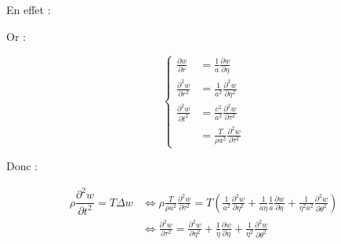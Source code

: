 \documentclass[a4,12pt]{article}
\begin{document}
En effet :


Or :

$$
\left\{\begin{aligned}
    \frac{\partial w}{\partial r} &= \frac{1}{a} \frac{\partial w}{\partial \eta} \\
    \frac{\partial^2 w}{\partial r^2} &= \frac{1}{a^2} \frac{\partial^2 w}{\partial \eta^2} \\
    \frac{\partial^2 w}{\partial t^2} &= \frac{c^2}{a^2} \frac{\partial^2 w}{\partial \tau^2} \\
                                      &= \frac{T}{\rho a^2} \frac{\partial^2 w}{\partial \tau^2}
\end{aligned}\right.
$$

Donc :

$$
\begin{aligned}
  \rho \dfrac{\partial^2 w}{\partial t^2} = T \Delta w
  &\Leftrightarrow
  \rho \frac{T}{\rho a^2} \frac{\partial^2 w}{\partial \tau^2} = T(\frac{1}{a^2} \frac{\partial^2 w}{\partial \eta^2} + \frac{1}{a\eta} \frac{1}{a} \frac{\partial w}{\partial \eta} + \frac{1}{\eta^2 a^2} \frac{\partial^2 w}{\partial \theta^2}) \\
  &\Leftrightarrow
  \frac{\partial^2 w}{\partial \tau^2} = \frac{\partial^2 w}{\partial \eta^2} + \frac{1}{\eta} \frac{\partial w}{\partial \eta} + \frac{1}{\eta^2} \frac{\partial^2 w}{\partial \theta^2}
\end{aligned}
$$

\end{document}
